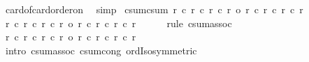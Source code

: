 \begin{isabellebody}
\ card{\isacharunderscore}{\kern0pt}of{\isacharunderscore}{\kern0pt}card{\isacharunderscore}{\kern0pt}order{\isacharunderscore}{\kern0pt}on\ \isamarkupfalse%
\ simp%
\endisatagproof
{\isafoldproof}%
%
\isadelimproof
\isanewline
%
\endisadelimproof
\isanewline
{}\isamarkupfalse%
\ csum{\isacharunderscore}{\kern0pt}csum{\isacharcolon}{\kern0pt}\ {\isachardoublequoteopen}{\isacharparenleft}{\kern0pt}r{}\ {\isacharplus}{\kern0pt}c\ r{}{\isacharparenright}{\kern0pt}\ {\isacharplus}{\kern0pt}c\ {\isacharparenleft}{\kern0pt}r{}\ {\isacharplus}{\kern0pt}c\ r{}{\isacharparenright}{\kern0pt}\ {\isacharequal}{\kern0pt}o\ {\isacharparenleft}{\kern0pt}r{}\ {\isacharplus}{\kern0pt}c\ r{}{\isacharparenright}{\kern0pt}\ {\isacharplus}{\kern0pt}c\ {\isacharparenleft}{\kern0pt}r{}\ {\isacharplus}{\kern0pt}c\ r{}{\isacharparenright}{\kern0pt}{\isachardoublequoteclose}\isanewline
%
\isadelimproof
%
\endisadelimproof
%
\isatagproof
{}\isamarkupfalse%
\ {\isacharminus}{\kern0pt}\isanewline
\ \ \isamarkupfalse%
\ {\isachardoublequoteopen}{\isacharparenleft}{\kern0pt}r{}\ {\isacharplus}{\kern0pt}c\ r{}{\isacharparenright}{\kern0pt}\ {\isacharplus}{\kern0pt}c\ {\isacharparenleft}{\kern0pt}r{}\ {\isacharplus}{\kern0pt}c\ r{}{\isacharparenright}{\kern0pt}\ {\isacharequal}{\kern0pt}o\ r{}\ {\isacharplus}{\kern0pt}c\ r{}\ {\isacharplus}{\kern0pt}c\ {\isacharparenleft}{\kern0pt}r{}\ {\isacharplus}{\kern0pt}c\ r{}{\isacharparenright}{\kern0pt}{\isachardoublequoteclose}\isanewline
\ \ \ \ \isamarkupfalse%
\ {\isacharparenleft}{\kern0pt}rule\ csum{\isacharunderscore}{\kern0pt}assoc{\isacharparenright}{\kern0pt}\isanewline
\ \ \isamarkupfalse%
\ \isamarkupfalse%
\ {\isachardoublequoteopen}r{}\ {\isacharplus}{\kern0pt}c\ r{}\ {\isacharplus}{\kern0pt}c\ {\isacharparenleft}{\kern0pt}r{}\ {\isacharplus}{\kern0pt}c\ r{}{\isacharparenright}{\kern0pt}\ {\isacharequal}{\kern0pt}o\ r{}\ {\isacharplus}{\kern0pt}c\ {\isacharparenleft}{\kern0pt}r{}\ {\isacharplus}{\kern0pt}c\ r{}{\isacharparenright}{\kern0pt}\ {\isacharplus}{\kern0pt}c\ r{}{\isachardoublequoteclose}\isanewline
\ \ \ \ \isamarkupfalse%
\ {\isacharparenleft}{\kern0pt}intro\ csum{\isacharunderscore}{\kern0pt}assoc\ csum{\isacharunderscore}{\kern0pt}cong{}\ ordIso{\isacharunderscore}{\kern0pt}symmetric{\isacharparenright}{\kern0pt}\isanewline

\end{isabellebody}
